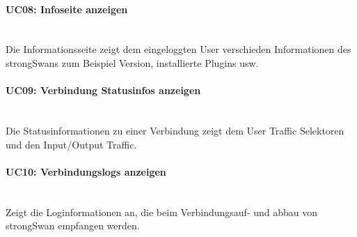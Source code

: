\paragraph{UC08: Infoseite anzeigen}\mbox{} \\
Die Informationsseite zeigt dem eingeloggten User verschieden Informationen des strongSwans zum Beispiel Version, installierte Plugins usw.

\paragraph{UC09: Verbindung Statusinfos anzeigen}\mbox{} \\
Die Statusinformationen zu einer Verbindung zeigt dem User Traffic Selektoren und den Input/Output Traffic.

\paragraph{UC10: Verbindungslogs anzeigen}\mbox{} \\
Zeigt die Loginformationen an, die beim Verbindungsauf- und abbau von strongSwan empfangen werden.

\newpage




